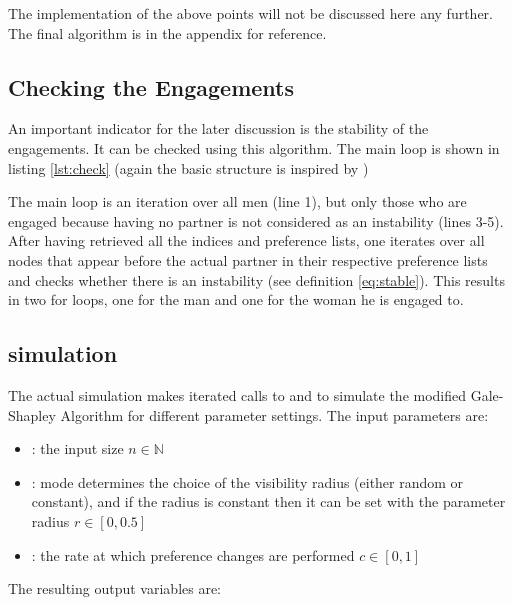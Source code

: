 \documentclass[11pt]{article}
\begin{document}
The implementation of the above points will not be discussed here any further. The final algorithm is in the appendix for reference.

\subsection{Checking the Engagements} \label{check}

An important indicator for the later discussion is the stability of the engagements. It can be checked using this algorithm. The main loop is
shown in listing \ref{lst:check} (again the basic structure is inspired by \citet{rosetta})

\begin{figure}[h]

\end{figure}

The main loop is an iteration over all men (line 1), but only those who are engaged because having no partner is not considered as an instability
(lines 3-5). After having retrieved all the indices and preference lists, one iterates over all nodes that appear before the actual partner in their
respective preference lists and checks whether there is an instability (see definition \ref{eq:stable}). This results in two for loops, one for the
man and one for the woman he is engaged to.

\subsection{simulation}

The actual simulation makes iterated calls to  and  to simulate the modified Gale-Shapley Algorithm
for different parameter settings. The input parameters are:

\begin{itemize}
  \item {}: the input size $n\in\mathbb{N}$
  \item {}: mode determines the choice of the visibility radius (either random or constant), and if the radius is constant
  then it can be set with the parameter radius $r\in[0,0.5]$
  \item {}: the rate at which preference changes are performed $c\in[0,1]$
\end{itemize}

The resulting output variables are:
\end{document}
